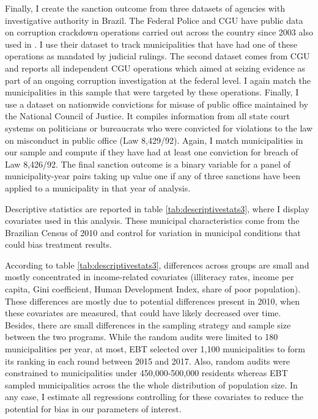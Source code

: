 \documentclass[11pt]{article}
\begin{document}
Finally, I create the sanction outcome from three datasets of agencies with investigative authority in Brazil. The Federal Police and CGU have public data on corruption crackdown operations carried out across the country since 2003 also used in \citep[also used in][]{AvisGovernmentAuditsReduce2018}. I use their dataset to track municipalities that have had one of these operations as mandated by judicial rulings. The second dataset comes from CGU and reports all independent CGU operations which aimed at seizing evidence as part of an ongoing corruption investigation at the federal level. I again match the municipalities in this sample that were targeted by these operations. Finally, I use a dataset on nationwide convictions for misuse of public office maintained by the National Council of Justice. It compiles information from all state court systems on politicians or bureaucrats who were convicted for violations to the law on misconduct in public office (Law 8,429/92). Again, I match municipalities in our sample and compute if they have had at least one conviction for breach of Law 8,426/92. The final sanction outcome is a binary variable for a panel of municipality-year pairs taking up value one if any of three sanctions have been applied to a municipality in that year of analysis.

Descriptive statistics are reported in table \ref{tab:descriptivestats3}, where I display covariates used in this analysis. These municipal characteristics come from the Brazilian Census of 2010 and control for variation in municipal conditions that could bias treatment results.



According to table \ref{tab:descriptivestats3}, differences across groups are small and mostly concentrated in income-related covariates (illiteracy rates, income per capita, Gini coefficient, Human Development Index, share of poor population). These differences are mostly due to potential differences present in 2010, when these covariates are measured, that could have likely decreased over time. Besides, there are small differences in the sampling strategy and sample size between the two programs. While the random audits were limited to 180 municipalities per year, at most, EBT selected over 1,100 municipalities to form its ranking in each round between 2015 and 2017. Also, random audits were constrained to municipalities under 450,000-500,000 residents whereas EBT sampled municipalities across the the whole distribution of population size. In any case, I estimate all regressions controlling for these covariates to reduce the potential for bias in our parameters of interest.
\end{document}
